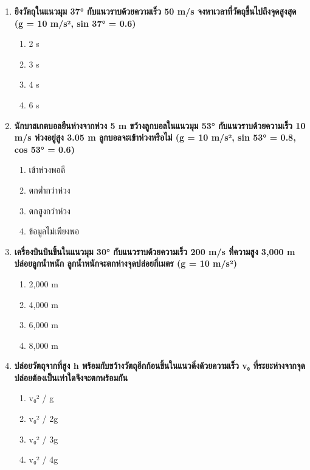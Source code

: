 \documentclass[12pt]{article}
\begin{document}
\begin{enumerate}
\begin{enumerate}[label=\alph*)]
\item 10 m/s
\item 20 m/s
\item 30 m/s
\item 40 m/s
\end{enumerate}
\item \textbf{ยิงวัตถุในแนวมุม 37° กับแนวราบด้วยความเร็ว 50 m/s จงหาเวลาที่วัตถุขึ้นไปถึงจุดสูงสุด (g = 10 m/s², sin 37° = 0.6)}
\begin{enumerate}[label=\alph*)]
\item 2 s
\item 3 s
\item 4 s
\item 6 s
\end{enumerate}
\item \textbf{นักบาสเกตบอลยืนห่างจากห่วง 5 m ขว้างลูกบอลในแนวมุม 53° กับแนวราบด้วยความเร็ว 10 m/s ห่วงอยู่สูง 3.05 m ลูกบอลจะเข้าห่วงหรือไม่ (g = 10 m/s², sin 53° = 0.8, cos 53° = 0.6)}
\begin{enumerate}[label=\alph*)]
\item เข้าห่วงพอดี
\item ตกต่ำกว่าห่วง
\item ตกสูงกว่าห่วง
\item ข้อมูลไม่เพียงพอ
\end{enumerate}
\item \textbf{เครื่องบินบินขึ้นในแนวมุม 30° กับแนวราบด้วยความเร็ว 200 m/s ที่ความสูง 3,000 m ปล่อยลูกน้ำหนัก ลูกน้ำหนักจะตกห่างจุดปล่อยกี่เมตร (g = 10 m/s²)}
\begin{enumerate}[label=\alph*)]
\item 2,000 m
\item 4,000 m
\item 6,000 m
\item 8,000 m
\end{enumerate}
\item \textbf{ปล่อยวัตถุจากที่สูง h พร้อมกับขว้างวัตถุอีกก้อนขึ้นในแนวดิ่งด้วยความเร็ว v₀ ที่ระยะห่างจากจุดปล่อยต้องเป็นเท่าใดจึงจะตกพร้อมกัน}
\begin{enumerate}[label=\alph*)]
\item v₀² / g
\item v₀² / 2g
\item v₀² / 3g
\item v₀² / 4g
\end{enumerate}
\end{enumerate}
\end{document}
